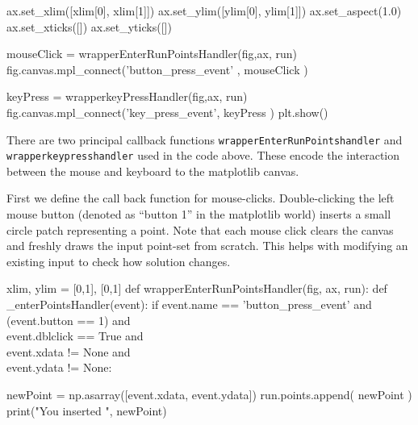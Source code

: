     ax.set_xlim([xlim[0], xlim[1]])
    ax.set_ylim([ylim[0], ylim[1]])
    ax.set_aspect(1.0)
    ax.set_xticks([])
    ax.set_yticks([])
      
    mouseClick   = wrapperEnterRunPointsHandler(fig,ax, run)
    fig.canvas.mpl_connect('button_press_event' , mouseClick )
      
    keyPress     = wrapperkeyPressHandler(fig,ax, run)
    fig.canvas.mpl_connect('key_press_event', keyPress   )
    plt.show()
\nwendcode{}\nwdocspar



There are two principal callback functions \verb|wrapperEnterRunPointshandler| and \verb|wrapperkeypresshandler| used in the code above. 
These encode the interaction between the mouse and keyboard to the matplotlib canvas. 

First we define the call back function for mouse-clicks. Double-clicking the left mouse button (denoted as ``button 1'' in the matplotlib world)
inserts a small circle patch representing a point. Note that each mouse click 
clears the canvas
and freshly draws the input point-set from scratch. 
This helps with modifying an existing input to check how solution changes. 

\nwenddocs{}\plusendmoddef\nwstartdeflinemarkup{}\nwenddeflinemarkup
xlim, ylim = [0,1], [0,1]
def wrapperEnterRunPointsHandler(fig, ax, run):
    def _enterPointsHandler(event):
        if event.name      == 'button_press_event'     and \\
           (event.button   == 1)                       and \\
            event.dblclick == True                     and \\
            event.xdata  != None                       and \\
            event.ydata  != None:

             newPoint = np.asarray([event.xdata, event.ydata])
             run.points.append( newPoint  )
             print("You inserted ", newPoint)

